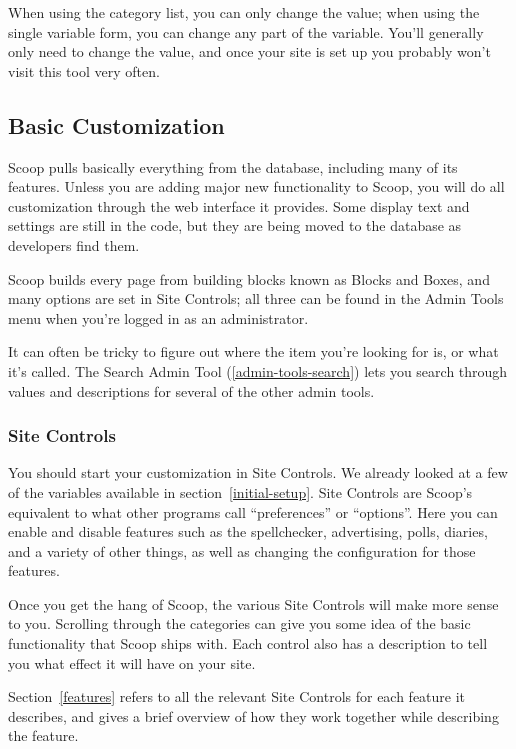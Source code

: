 When using the category list, you can only change the value; when using the single variable form, you can change any part of the variable.  You'll generally only need to change the value, and once your site is set up you probably won't visit this tool very often.

\subsection{Basic Customization}
\label{how-start}

Scoop pulls basically everything from the database, including many of its features.  Unless you are adding major new functionality to Scoop, you will do all customization through the web interface it provides.  Some display text and settings are still in the code, but they are being moved to the database as developers find them.

Scoop builds every page from building blocks known as Blocks and Boxes, and many options are set in Site Controls; all three can be found in the Admin Tools menu when you're logged in as an administrator.

It can often be tricky to figure out where the item you're looking for is, or what it's called. The Search Admin Tool (\ref{admin-tools-search}) lets you search through values and descriptions for several of the other admin tools.

\subsubsection{Site Controls}
\label{how-vars}

You should start your customization in Site Controls.  We already looked at a few of the variables available in section~\ref{initial-setup}.  Site Controls are Scoop's equivalent to what other programs call ``preferences'' or ``options''.  Here you can enable and disable features such as the spellchecker, advertising, polls, diaries, and a variety of other things, as well as changing the configuration for those features.

Once you get the hang of Scoop, the various Site Controls will make more sense to you.   Scrolling through the categories can give you some idea of the basic functionality that Scoop ships with.  Each control also has a description to tell you what effect it will have on your site.

Section~\ref{features} refers to all the relevant Site Controls for each feature it describes, and gives a brief overview of how they work together while describing the feature.

